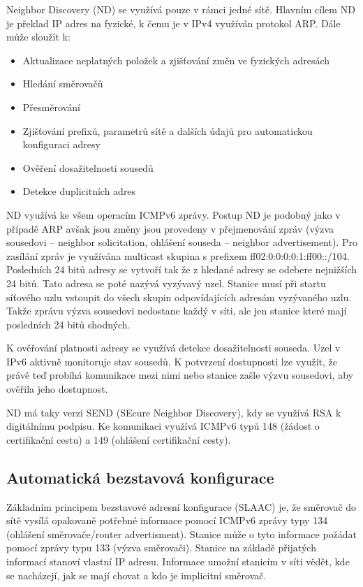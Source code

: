 Neighbor Discovery (ND) se využívá pouze v rámci jedné sítě.
Hlavním cílem ND je překlad IP adres na fyzické, k čemu je v IPv4 využíván protokol ARP.
Dále může sloužit k:
\begin{itemize}[noitemsep]
    \item Aktualizace neplatných položek a zjišťování změn ve fyzických adresách
    \item Hledání směrovačů
    \item Přesměrování
    \item Zjišťování prefixů, parametrů sítě a dalších údajů pro automatickou konfiguraci adresy
    \item Ověření dosažitelnosti sousedů
    \item Detekce duplicitních adres
\end{itemize}

ND využívá ke všem operacím ICMPv6 zprávy.
Postup ND je podobný jako v případě ARP avšak jsou změny jsou provedeny v přejmenování zpráv (výzva sousedovi -- neighbor solicitation, ohlášení souseda -- neighbor advertisement).
Pro zasílání zpráv je využívána multicast skupina s prefixem ff02:0:0:0:0:1:ff00::/104.
Posledních 24 bitů adresy se vytvoří tak že z hledané adresy se odebere nejnižších 24 bitů.
Tato adresa se poté nazývá vyzývavý uzel.
Stanice musí při startu síťového uzlu vstoupit do všech skupin odpovídajících adresám vyzývaného uzlu.
Takže zprávu výzva sousedovi nedostane každý v síti, ale jen stanice které mají posledních 24 bitů shodných.

K ověřování platnosti adresy se využívá detekce dosažitelnosti souseda.
Uzel v IPv6 aktivně monitoruje stav sousedů.
K potvrzení dostupnosti lze využít, že právě teď probíhá komunikace mezi nimi nebo stanice zašle výzvu sousedovi, aby ověřila jeho dostupnost.

ND má taky verzi SEND (SEcure Neighbor Discovery), kdy se využívá RSA k digitálnímu podpisu.
Ke komunikaci využívá ICMPv6 typů 148 (žádost o certifikační cestu) a 149 (ohlášení certifikační cesty).

\subsection{Automatická bezstavová konfigurace}

Základním principem bezstavové adresní konfigurace (SLAAC) je, že směrovač do sítě vysílá opakovaně potřebné informace pomocí ICMPv6 zprávy typy 134 (ohlášení směrovače/router advertisment).
Stanice může o tyto informace požádat pomocí zprávy typu 133 (výzva směrovači).
Stanice na základě přijatých informací stanoví vlastní IP adresu.
Informace umožní stanicím v síti vědět, kde se nacházejí, jak se mají chovat a kdo je implicitní směrovač.



